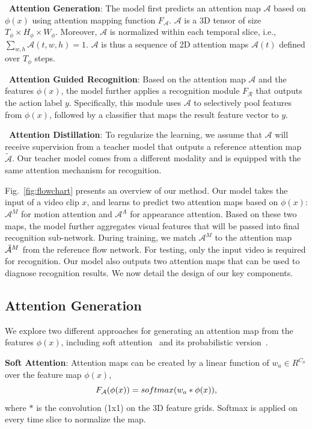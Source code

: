 \documentclass[10pt,twocolumn,letterpaper]{article}
\begin{document}
\noindent \textbullet\ \textbf{Attention Generation}: The model first predicts an attention map $\mathcal{A}$ based on $\phi(x)$ using attention mapping function $F_{\mathcal{A}}$. $\mathcal{A}$ is a 3D tensor of size $T_\phi \times H_\phi \times W_\phi$. Moreover, $\mathcal{A}$ is normalized within each temporal slice, i.e., $\sum_{w,h} \mathcal{A}(t,w,h)=1$. $\mathcal{A}$ is thus a sequence of 2D attention maps $\mathcal{A}(t)$ defined over $T_\phi$ steps. 

\noindent \textbullet\ \textbf{Attention Guided Recognition}: Based on the attention map $\mathcal{A}$ and the features $\phi(x)$, the model further applies a recognition module $F_{\mathcal{R}}$ that outputs the action label $y$. Specifically, this module uses $\mathcal{A}$ to selectively pool features from $\phi(x)$, followed by a classifier that maps the result feature vector to $y$.

\noindent \textbullet\ \textbf{Attention Distillation}: To regularize the learning, we assume that $\mathcal{A}$ will receive supervision from a teacher model that outputs a reference attention map $\mathcal{\tilde{A}}$. Our teacher model comes from a different modality and is equipped with the same attention mechanism for recognition.

Fig.\ \ref{fig:flowchart} presents an overview of our method. Our model takes the input of a video clip $x$, and learns to predict two attention maps based on $\phi(x)$: $\mathcal{A}^M$ for motion attention and $\mathcal{A}^A$ for appearance attention. Based on these two maps, the model further aggregates visual features that will be passed into final recognition sub-network. During training, we match $\mathcal{A}^M$ to the attention map $\mathcal{\Tilde{A}}^M$ from the reference flow network. For testing, only the input video is required for recognition. Our model also outputs two attention maps that can be used to diagnose recognition results. We now detail the design of our key components.

\subsection{Attention Generation}
We explore two different approaches for generating an attention map from the features $\phi(x)$, including soft attention~\cite{wang2017residual} and its probabilistic version~\cite{Li_2018_ECCV}.

\noindent \textbf{Soft Attention}: Attention maps can be created by a linear function of $w_a \in R^{C_\phi}$ over the feature map $\phi(x)$,
\begin{equation}
\small
    F_{\mathcal{A}}(\phi(x)) = softmax(w_a * \phi(x)),
\end{equation}
where $*$ is the convolution (1x1) on the 3D feature grids. Softmax is applied on every time slice to normalize the map.
\end{document}
